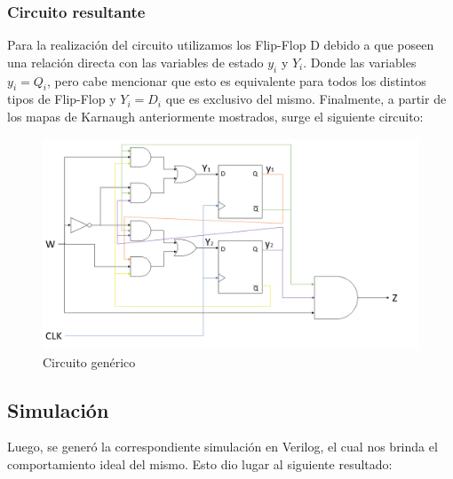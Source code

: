 \begin{center}
	\hspace*{\fill}
\end{center}
\subsubsection{Circuito resultante}
Para la realización del circuito utilizamos los Flip-Flop D debido a que poseen una relación directa con las variables de estado $y_i$ y $Y_i$. Donde las variables $y_i=Q_i$, pero cabe mencionar que esto es equivalente para todos los distintos tipos de Flip-Flop y $Y_i=D_i$ que es exclusivo del mismo.
Finalmente, a partir de los mapas de Karnaugh anteriormente mostrados, surge el siguiente circuito:\\
\begin{figure}[H]
	\centering
	\includegraphics[scale=0.4]{Ejercicio2/Circuito.png}
	\caption{Circuito genérico}
\end{figure}
\subsection{Simulación}
Luego, se generó la correspondiente simulación en Verilog, el cual nos brinda el comportamiento ideal del mismo. Esto dio lugar al siguiente resultado:\\
